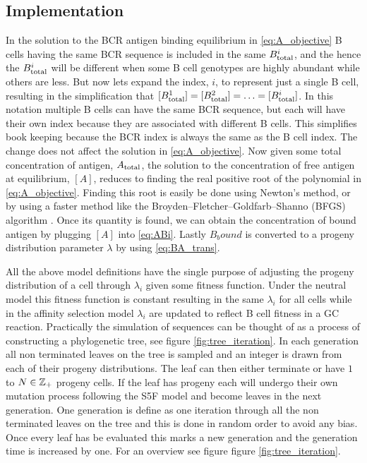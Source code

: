 \subsection{Implementation}
In the solution to the BCR antigen binding equilibrium in \eqref{eq:A_objective} B cells having the same BCR sequence is included in the same $B^i_{\text{total}}$, and the hence the $B^i_{\text{total}}$ will be different when some B cell genotypes are highly abundant while others are less.
But now lets expand the index, $i$, to represent just a single B cell, resulting in the simplification that $[B^1_{\text{total}}] = [B^2_{\text{total}}] = \ldots = [B^i_{\text{total}}]$.
In this notation multiple B cells can have the same BCR sequence, but each will have their own index because they are associated with different B cells.
This simplifies book keeping because the BCR index is always the same as the B cell index.
The change does not affect the solution in \eqref{eq:A_objective}.
Now given some total concentration of antigen, $A_{\text{total}}$, the solution to the concentration of free antigen at equilibrium, $[A]$, reduces to finding the real positive root of the polynomial in \eqref{eq:A_objective}.
Finding this root is easily be done using Newton's method, or by using a faster method like the Broyden–Fletcher–Goldfarb–Shanno (BFGS) algorithm \cite{shanno1985broyden}.
Once its quantity is found, we can obtain the concentration of bound antigen by plugging $[A]$ into \eqref{eq:ABi}.
Lastly $B_bound$ is converted to a progeny distribution parameter $\lambda$ by using \eqref{eq:BA_trans}.

All the above model definitions have the single purpose of adjusting the progeny distribution of a cell through $\lambda_i$ given some fitness function.
Under the neutral model this fitness function is constant resulting in the same $\lambda_i$ for all cells while in the affinity selection model $\lambda_i$ are updated to reflect B cell fitness in a GC reaction.
Practically the simulation of sequences can be thought of as a process of constructing a phylogenetic tree, see figure \ref{fig:tree_iteration}.
In each generation all non terminated leaves on the tree is sampled and an integer is drawn from each of their progeny distributions.
The leaf can then either terminate or have $1$ to $N \in \mathbb{Z}_+$ progeny cells.
If the leaf has progeny each will undergo their own mutation process following the S5F model and become leaves in the next generation.
One generation is define as one iteration through all the non terminated leaves on the tree and this is done in random order to avoid any bias.
Once every leaf has be evaluated this marks a new generation and the generation time is increased by one.
For an overview see figure figure \ref{fig:tree_iteration}.

